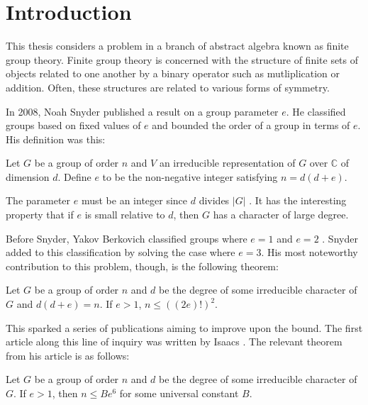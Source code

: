 \documentclass[main.tex]{subfiles}
\begin{document}
\chapter{Introduction}

This thesis considers a problem in a branch of abstract algebra known as finite group theory. Finite group theory is concerned with the structure of finite sets of objects related to one another by a binary operator such as mutliplication or addition. Often, these structures are related to various forms of symmetry.

\hss 

In 2008, Noah Snyder \cite{snyderarticle} published a result on a group parameter $e$. He classified groups based on fixed values of $e$ and bounded the order of a group in terms of $e$. His definition was this:

\hss

\begin{definition}
Let $G$ be a group of order $n$ and $V$ an irreducible representation of $G$ over $\mathbb{C}$ of dimension $d$. Define $e$ to be the non-negative integer satisfying $n = d(d + e)$.
\end{definition}

\hss

The parameter $e$ must be an integer since $d$ divides $|G|$ \cite[p.96]{gorensteinfinitegroups}. It has the interesting property that if $e$ is small relative to $d$, then $G$ has a character of large degree.

Before Snyder, Yakov Berkovich classified groups where $e=1$ and $e=2$ \cite{berkovicharticle}. Snyder added to this classification by solving the case where $e=3$. His most noteworthy contribution to this problem, though, is the following theorem:

\hss

\begin{theorem}
Let $G$ be a group of order $n$ and $d$ be the degree of some irreducible character of $G$ and $d(d+e) = n$. If $e > 1$, $n \le ((2e)!)^2$.
\end{theorem}

\hss

This sparked a series of publications aiming to improve upon the bound. The first article along this line of inquiry was written by Isaacs \cite{isaacsarticle}. The relevant theorem from his article is as follows:

\hss

\begin{theorem} Let $G$ be a group of order $n$ and $d$ be the degree of some irreducible character of $G$. If $e > 1$, then $n \le Be^6$ for some universal constant $B$.
\end{theorem}
\end{document}
